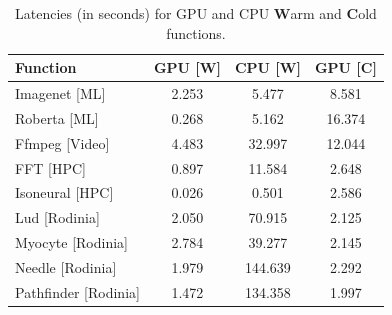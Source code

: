 \begin{table}
  \centering
  \caption{Latencies (in seconds) for GPU and CPU \textbf{W}arm and \textbf{C}old functions.}
  \label{tab:gpu-cpu}
  \begin{tabular}{lccc}
    \hline
    Function & GPU [\textbf{W}] & CPU [\textbf{W}] & GPU [\textbf{C}] \\
    \hline
  Imagenet [ML] & 2.253 & 5.477 &     8.581 \\
  Roberta [ML] & 0.268 & 5.162 &     16.374 \\
  Ffmpeg [Video] & 4.483 & 32.997 &     12.044 \\
  FFT [HPC] & 0.897 & 11.584 &     2.648 \\
  Isoneural [HPC] & 0.026 & 0.501 &     2.586 \\
  Lud [Rodinia] & 2.050 & 70.915 &     2.125 \\
    Myocyte [Rodinia] & 2.784 & 39.277 &      2.145 \\
  Needle [Rodinia] & 1.979 & 144.639 &     2.292 \\
  Pathfinder [Rodinia] & 1.472 & 134.358 &     1.997 \\
  \end{tabular}
\end{table}

